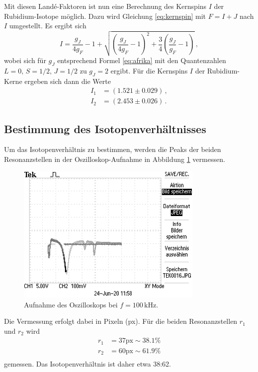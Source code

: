 Mit diesen Landé-Faktoren ist nun eine Berechnung des Kernspins $I$ der Rubidium-Isotope möglich. 
Dazu wird Gleichung \eqref{eq:kernspin} mit $F = I + J$ nach $I$ umgestellt. Es ergibt sich
\begin{equation*}
    I = \frac{g_J}{4 g_F} - 1 + \sqrt{\left(\frac{g_J}{4 g_F} - 1\right)^2 + \frac{3}{4} \left(\frac{g_J}{g_F} - 1\right)} \, , 
\end{equation*}
wobei sich für $g_J$ entsprechend Formel \eqref{eq:afrika} mit den Quantenzahlen $L = 0, \, S = 1/2, \, J = 1/2$ zu 
$g_J = 2$ ergibt.
Für die Kernspins $I$ der Rubidium-Kerne ergeben sich dann die Werte
\begin{align*}
    I_1 &= (1.521 \pm 0.029) \, ,\\
    I_2 &= (2.453 \pm 0.026) \, .
\end{align*}

\subsection{Bestimmung des Isotopenverhältnisses}
Um das Isotopenverhältnis zu bestimmen, werden die Peaks der beiden Resonanzstellen in der Oszilloskop-Aufnahme in Abbildung \ref{fig:afig2} vermessen.
\FloatBarrier
\begin{figure}[h]
    \centering
    \includegraphics[width=0.8\textwidth]{TEK0016.JPG}
    \caption{Aufnahme des Oszilloskops bei $f = 100 \, \text{kHz}$.}
    \label{fig:afig2}
\end{figure}
\FloatBarrier
\noindent
Die Vermessung erfolgt dabei in Pixeln (px). Für die beiden Resonanzstellen $r_1$ und $r_2$ wird
\begin{align*}
    r_1 &= 37 \text{px} \sim 38.1 \% \\
    r_2 &= 60 \text{px} \sim 61.9 \% \\
\end{align*}
gemessen. 
Das Isotopenverhältnis ist daher etwa 38:62.

